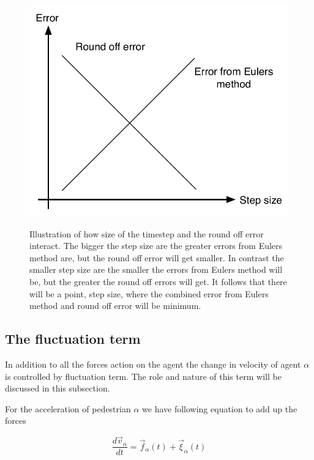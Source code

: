 \begin{figure}
    \centering
    {\includegraphics[scale=0.45]{Figures/timestepfigure.pdf}} 
    \caption[Errors from timestep size and Euler's method]{\small{Illustration of how size of the timestep and the round off error interact.
	     The bigger the step size are the greater errors from Eulers method are, but the round off error will get smaller.
	     In contrast the smaller step size are the smaller the errors from Eulers method will be, but the greater the round off
	     errors will get. It follows that there will be a point, step size, where the combined error from Eulers method and round off error
	     will be minimum.}}
    \label{timestepfigure}
\end{figure}

\subsection{The fluctuation term}
In addition to all the forces action on the agent the change in velocity of agent 
$\alpha$ is controlled by fluctuation term. The role and nature of this term will 
be discussed in this subsection.

For the acceleration of pedestrian $\alpha$ we have following equation to add up the forces

\begin{equation}
\frac{d\vec{v}_{\alpha}}{dt}=\vec{f}_{\alpha}(t)+\vec{\xi}_{\alpha}(t)
\end{equation}

